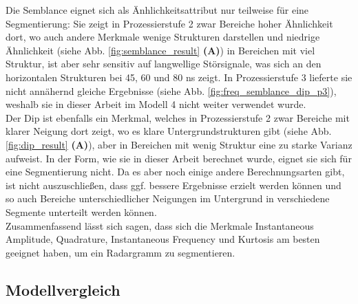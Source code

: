 Die Semblance eignet sich als Änhlichkeitsattribut nur teilweise für eine Segmentierung: Sie zeigt in Prozessierstufe 2 zwar Bereiche hoher Ähnlichkeit dort, wo auch andere Merkmale wenige Strukturen darstellen und niedrige Ähnlichkeit (siehe Abb. \ref{fig:semblance_result} \textbf{(A)}) in Bereichen mit viel Struktur, ist aber sehr sensitiv auf langwellige Störsignale, was sich an den horizontalen Strukturen bei 45, 60 und 80 ns zeigt. In Prozessierstufe 3 lieferte sie nicht annähernd gleiche Ergebnisse (siehe Abb. \ref{fig:freq_semblance_dip_p3}), weshalb sie in dieser Arbeit im Modell 4 nicht weiter verwendet wurde.\\
Der Dip ist ebenfalls ein Merkmal, welches in Prozessierstufe 2 zwar Bereiche mit klarer Neigung dort zeigt, wo es klare Untergrundstrukturen gibt (siehe Abb. \ref{fig:dip_result} \textbf{(A)}), aber in Bereichen mit wenig Struktur eine zu starke Varianz aufweist. In der Form, wie sie in dieser Arbeit berechnet wurde, eignet sie sich für eine Segmentierung nicht. Da es aber noch einige andere Berechnungsarten gibt, ist nicht auszuschließen, dass ggf. bessere Ergebnisse erzielt werden können und so auch Bereiche unterschiedlicher Neigungen im Untergrund in verschiedene Segmente unterteilt werden können.\\
Zusammenfassend lässt sich sagen, dass sich die Merkmale Instantaneous Amplitude, Quadrature, Instantaneous Frequency und Kurtosis am besten geeignet haben, um ein Radargramm zu segmentieren.

\subsection{Modellvergleich}

